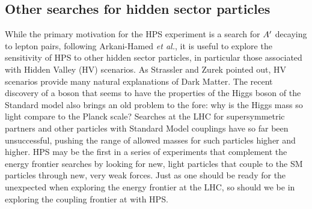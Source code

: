 \subsection{Other searches for hidden sector particles}
\label{sec:hidden_ex}

While the primary motivation for the HPS experiment is a search for $A^\prime$ decaying to lepton pairs, following Arkani-Hamed {\it et al.\/}\cite{ArkaniHamed:2008qn}, it is useful to explore the sensitivity of HPS to other hidden sector particles, in particular those associated with Hidden Valley (HV) scenarios. As Strassler and Zurek\cite{Strassler:2006im} pointed out, HV scenarios provide many natural explanations of Dark Matter. The recent discovery of a boson that seems to have the properties of the Higgs boson of the Standard model also brings an old problem to the fore: why is the Higgs mass so light compare to the Planck scale? Searches at the LHC for supersymmetric partners and other particles with Standard Model couplings have so far been unsuccessful, pushing the range of allowed masses for such particles higher and higher. HPS may be the first in a series of experiments that complement the energy frontier searches by looking for new, light particles that couple to the SM particles through new, very weak forces. Just as one should be ready for the  unexpected when exploring the energy frontier at the LHC, so should we be in exploring the coupling frontier at with HPS.

